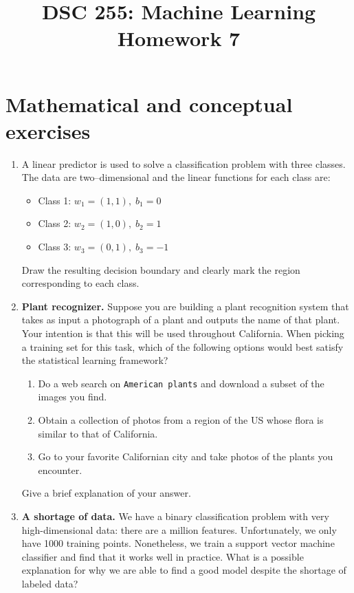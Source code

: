 \documentclass{article}
\title{DSC 255: Machine Learning \\ Homework 7}
\author{}
\date{}
\begin{document}
\maketitle

\section*{Mathematical and conceptual exercises}

\begin{enumerate}[label=\textbf{\arabic*.}]
\item A linear predictor is used to solve a classification problem with three classes.
      The data are two–dimensional and the linear functions for each class are:
      \begin{itemize}
      \item Class 1: $w_{1} = (1,1),\; b_{1} = 0$
      \item Class 2: $w_{2} = (1,0),\; b_{2} = 1$
      \item Class 3: $w_{3} = (0,1),\; b_{3} = -1$
      \end{itemize}
      Draw the resulting decision boundary and clearly mark the region
      corresponding to each class.

\item \textbf{Plant recognizer.}
      Suppose you are building a plant recognition system that takes as
      input a photograph of a plant and outputs the name of that plant.
      Your intention is that this will be used throughout California.
      When picking a training set for this task, which of the following
      options would best satisfy the statistical learning framework?
      \begin{enumerate}[label=(\alph*)]
      \item Do a web search on \texttt{American plants} and download a subset of the images you find.
      \item Obtain a collection of photos from a region of the US whose flora is similar to that of California.
      \item Go to your favorite Californian city and take photos of the plants you encounter.
      \end{enumerate}
      Give a brief explanation of your answer.

\item \textbf{A shortage of data.}
      We have a binary classification problem with very high-dimensional
      data: there are a million features.  Unfortunately, we only have
      1000 training points.  Nonetheless, we train a support vector
      machine classifier and find that it works well in practice.
      What is a possible explanation for why we are able to find a good
      model despite the shortage of labeled data?


\end{enumerate}
\end{document}
